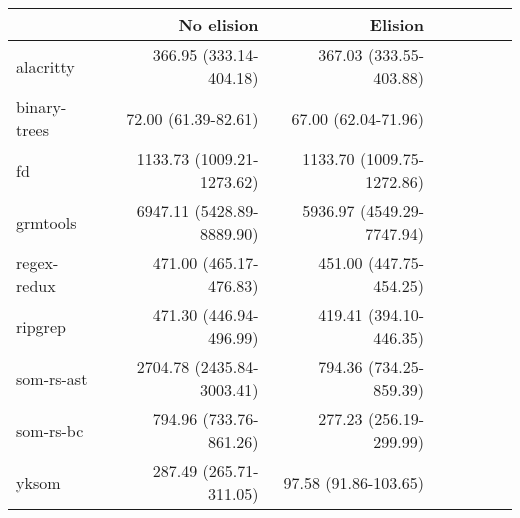 \begin{tabular}{lrrrrrrr}
\toprule
 & No elision & Elision \\
\midrule
alacritty & 366.95 \footnotesize{(333.14-404.18)} & 367.03 \footnotesize{(333.55-403.88)} \\
binary-trees & 72.00 \footnotesize{(61.39-82.61)} & 67.00 \footnotesize{(62.04-71.96)} \\
fd & 1133.73 \footnotesize{(1009.21-1273.62)} & 1133.70 \footnotesize{(1009.75-1272.86)} \\
grmtools & 6947.11 \footnotesize{(5428.89-8889.90)} & 5936.97 \footnotesize{(4549.29-7747.94)} \\
regex-redux & 471.00 \footnotesize{(465.17-476.83)} & 451.00 \footnotesize{(447.75-454.25)} \\
ripgrep & 471.30 \footnotesize{(446.94-496.99)} & 419.41 \footnotesize{(394.10-446.35)} \\
som-rs-ast & 2704.78 \footnotesize{(2435.84-3003.41)} & 794.36 \footnotesize{(734.25-859.39)} \\
som-rs-bc & 794.96 \footnotesize{(733.76-861.26)} & 277.23 \footnotesize{(256.19-299.99)} \\
yksom & 287.49 \footnotesize{(265.71-311.05)} & 97.58 \footnotesize{(91.86-103.65)} \\
\bottomrule
\end{tabular}
